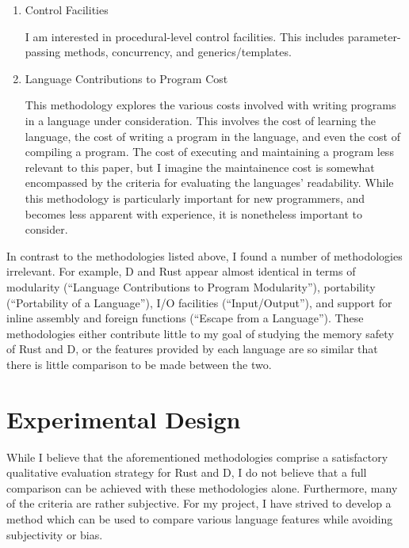\documentclass[finalcopy]{srpaper}
\begin{document}
\begin{enumerate}
\item Control Facilities

I am interested in procedural-level control facilities. This includes
parameter-passing methods, concurrency, and generics/templates.

\item Language Contributions to Program Cost

This methodology explores the various costs involved with writing programs in a
language under consideration. This involves the cost of learning the language,
the cost of writing a program in the language, and even the cost of compiling a
program. The cost of executing and maintaining a program less relevant to this
paper, but I imagine the maintainence cost is somewhat encompassed by the
criteria for evaluating the languages' readability. While this methodology is
particularly important for new programmers, and becomes less apparent with
experience, it is nonetheless important to consider.

\end{enumerate}

In contrast to the methodologies listed above, I found a number of
methodologies irrelevant. For example, D and Rust appear almost identical in
terms of modularity (``Language Contributions to Program Modularity''),
portability (``Portability of a Language''), I/O facilities (``Input/Output''),
and support for inline assembly and foreign functions (``Escape from a
Language''). These methodologies either contribute little to my goal of
studying the memory safety of Rust and D, or the features provided by each
language are so similar that there is little comparison to be made between the
two.

\section{Experimental Design}

While I believe that the aforementioned methodologies comprise a satisfactory
qualitative evaluation strategy for Rust and D, I do not believe that a full
comparison can be achieved with these methodologies alone. Furthermore, many of
the criteria are rather subjective. For my project, I have strived to develop a
method which can be used to compare various language features while avoiding
subjectivity or bias.
\end{document}
